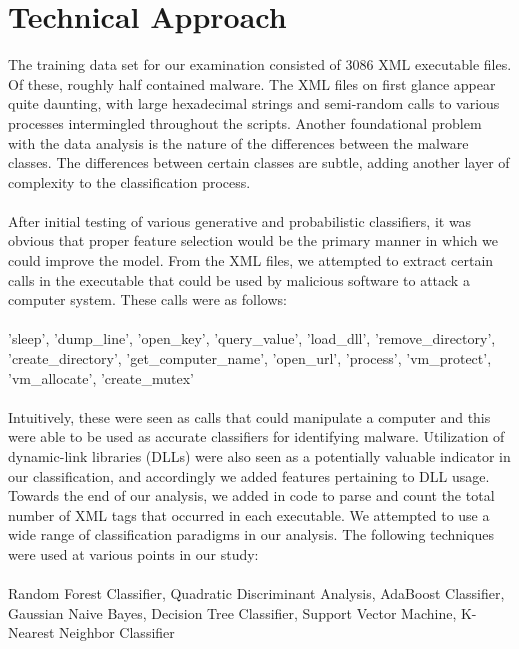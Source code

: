 \documentclass{article}
\begin{document}
\section{Technical Approach}
The training data set for our examination consisted of 3086 XML executable files. Of these, roughly half contained malware. The XML files on first glance appear quite daunting, with large hexadecimal strings and semi-random calls to various processes intermingled throughout the scripts. Another foundational problem with the data analysis is the nature of the differences between the malware classes. The differences between certain classes are subtle, adding another layer of complexity to the classification process.\\\\
After initial testing of various generative and probabilistic classifiers, it was obvious that proper feature selection would be the primary manner in which we could improve the model. From the XML files, we attempted to extract certain calls in the executable that could be used by malicious software to attack a computer system. These calls were as follows:\\\\
'sleep', 'dump\_line', 'open\_key', 'query\_value', 'load\_dll', 'remove\_directory', 'create\_directory', 'get\_computer\_name', 'open\_url', 'process', 'vm\_protect', 'vm\_allocate', 'create\_mutex'\\\\
Intuitively, these were seen as calls that could manipulate a computer and this were able to be used as accurate classifiers for identifying malware. Utilization of dynamic-link libraries (DLLs) were also seen as a potentially valuable indicator in our classification, and accordingly we added features pertaining to DLL usage. Towards the end of our analysis, we added in code to parse and count the total number of XML tags that occurred in each executable. 
We attempted to use a wide range of classification paradigms in our analysis. The following techniques were used at various points in our study:\\\\
Random Forest Classifier, Quadratic Discriminant Analysis, AdaBoost Classifier,  Gaussian Naive Bayes, Decision Tree Classifier, Support Vector Machine, K-Nearest Neighbor Classifier
\end{document}
